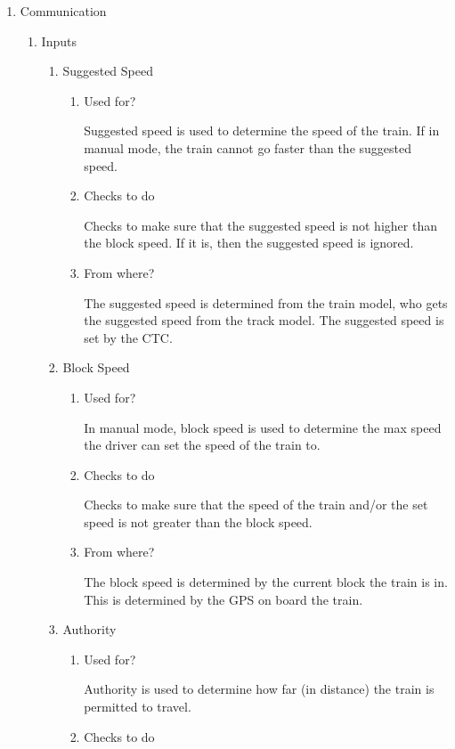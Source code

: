 \documentclass[11pt]{article}
\begin{document}
\begin{enumerate}
\item Communication
\label{sec-3-1-5-8}
\begin{enumerate}
\item Inputs
\label{sec-3-1-5-8-1}
\begin{enumerate}
\item Suggested Speed
\label{sec-3-1-5-8-1-1}
\begin{enumerate}
\item Used for?
\label{sec-3-1-5-8-1-1-1}

Suggested speed is used to determine the speed of the train. If in manual mode, the train cannot go faster than the suggested speed. 
\item Checks to do
\label{sec-3-1-5-8-1-1-2}

Checks to make sure that the suggested speed is not higher than the block speed. If it is, then the suggested speed is ignored. 
\item From where?
\label{sec-3-1-5-8-1-1-3}

The suggested speed is determined from the train model, who gets the suggested speed from the track model. The suggested speed is set by the CTC.
\end{enumerate}
\item Block Speed
\label{sec-3-1-5-8-1-2}
\begin{enumerate}
\item Used for?
\label{sec-3-1-5-8-1-2-1}

In manual mode, block speed is used to determine the max speed the driver can set the speed of the train to.
\item Checks to do
\label{sec-3-1-5-8-1-2-2}

Checks to make sure that the speed of the train and/or the set speed is not greater than the block speed. 
\item From where?
\label{sec-3-1-5-8-1-2-3}

The block speed is determined by the current block the train is in. This is determined by the GPS on board the train.
\end{enumerate}
\item Authority
\label{sec-3-1-5-8-1-3}
\begin{enumerate}
\item Used for?
\label{sec-3-1-5-8-1-3-1}

Authority is used to determine how far (in distance) the train is permitted to travel.
\item Checks to do
\label{sec-3-1-5-8-1-3-2}


\end{enumerate}
\end{enumerate}
\end{enumerate}
\end{enumerate}
\end{document}
